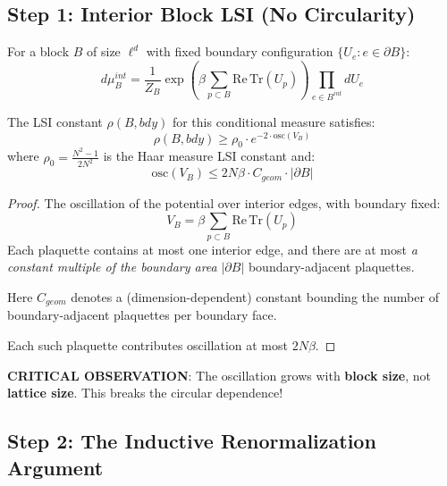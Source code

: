 \subsection{Step 1: Interior Block LSI (No Circularity)}

\begin{lemma}
\label{lem:interior-block}
For a block $B$ of size $\ell^d$ with fixed boundary configuration $\{U_e : e \in \partial B\}$:
\begin{equation}
d\mu_{B}^{int} = \frac{1}{Z_B} \exp\left(\beta \sum_{p \subset B} \mathrm{Re}\,\mathrm{Tr}(U_p)\right) 
\prod_{e \in B^{int}} dU_e
\end{equation}

The LSI constant $\rho(B, bdy)$ for this conditional measure satisfies:
\begin{equation}
\rho(B, bdy) \geq \rho_0 \cdot e^{-2 \cdot \mathrm{osc}(V_B)}
\end{equation}
where $\rho_0 = \frac{N^2-1}{2N^2}$ is the Haar measure LSI constant and:
\begin{equation}
\mathrm{osc}(V_B) \leq 2N\beta \cdot C_{geom} \cdot |\partial B|
\end{equation}
\end{lemma}

\begin{proof}
The oscillation of the potential over interior edges, with boundary fixed:
\begin{equation}
V_B = \beta \sum_{p \subset B} \mathrm{Re}\,\mathrm{Tr}(U_p)
\end{equation}
Each plaquette contains at most one interior edge, and there are at most 
\emph{a constant multiple of the boundary area} $|\partial B|$ boundary-adjacent plaquettes.

Here $C_{geom}$ denotes a (dimension-dependent) constant bounding the number of boundary-adjacent plaquettes per boundary face.

Each such plaquette contributes oscillation at most $2N\beta$.
\end{proof}

\textbf{CRITICAL OBSERVATION}: The oscillation grows with \textbf{block size}, 
not \textbf{lattice size}. This breaks the circular dependence!

\subsection{Step 2: The Inductive Renormalization Argument}

